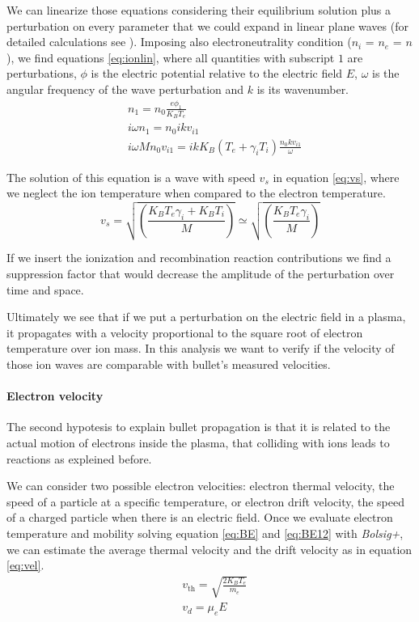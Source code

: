 We can linearize those equations considering their equilibrium solution plus a perturbation on every parameter that we could expand in linear plane waves (for detailed calculations see \cite{book:567903}). Imposing also electroneutrality condition ($n_i$ = $n_e$ = $n$), we find equations \ref{eq:ionlin}, where all quantities with subscript $1$ are perturbations, $\phi$ is the electric potential relative to the electric field $E$, $\omega$ is the angular frequency of the wave perturbation and $k$ is its wavenumber.
\begin{equation}
 \begin{split}
  &n_1 = n_0 \frac{e \phi_1}{K_B T_e}\\
  &i \omega n_1 = n_0 i k v_{i1}\\
  &i \omega M n_0 v_{i1} = i k K_B (T_e + \gamma_i T_i) \frac{n_0 k v_{i1}}{\omega}
 \end{split}
\label{eq:ionlin}
\end{equation}

The solution of this equation is a wave with speed $v_{s}$ in equation \ref{eq:vs}, where we neglect the ion temperature when compared to the electron temperature.
\begin{equation}
 v_s = \sqrt{\left(\frac{K_B T_e \gamma_i + K_B T_i}{M}\right)} \simeq \sqrt{\left(\frac{K_B T_e \gamma_i}{M}\right)}
 \label{eq:vs}
\end{equation}


If we insert the ionization and recombination reaction contributions we find a suppression factor that would decrease the amplitude of the perturbation over time and space.

Ultimately we see that if we put a perturbation on the electric field in a plasma, it propagates with a velocity proportional to the square root of electron temperature over ion mass. In this analysis we want to verify if the velocity of those ion waves are comparable with bullet's measured velocities.


\paragraph{Electron velocity}
The second hypotesis to explain bullet propagation is that it is related to the actual motion of electrons inside the plasma, that colliding with ions leads to reactions as expleined before.

We can consider two possible electron velocities: electron thermal velocity, the speed of a particle at a specific temperature, or electron drift velocity, the speed of a charged particle when there is an electric field. Once we evaluate electron temperature and mobility solving equation \ref{eq:BE} and \ref{eq:BE12} with \emph{Bolsig+}, we can estimate the average thermal velocity and the drift velocity as in equation \ref{eq:vel}.
\begin{equation}
 \begin{split}
  &v_{\text{th}} = \sqrt{\frac{2 K_B T_e}{m_e}} \\
  &v_d = \mu_e E
 \end{split}
\label{eq:vel}
\end{equation}


